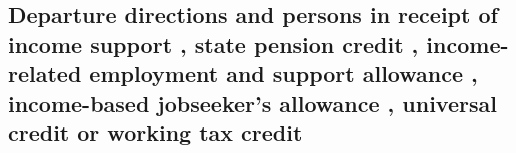 \documentclass[12pt,a4paper]{article}
\begin{document}
%
%
%

\subsection[9. Departure directions and~persons in receipt of income support%
, state pension credit%
,~income-related employment and~support allowance%
, income-based jobseeker’s allowance%
, universal credit  %
or working tax credit%
]{\sloppy Departure directions and persons in receipt of income support%
, state pension credit%
, income-related employment and support allowance%
, income-based jobseeker’s allowance%
, universal credit  %
or working tax credit%
}
\end{document}
